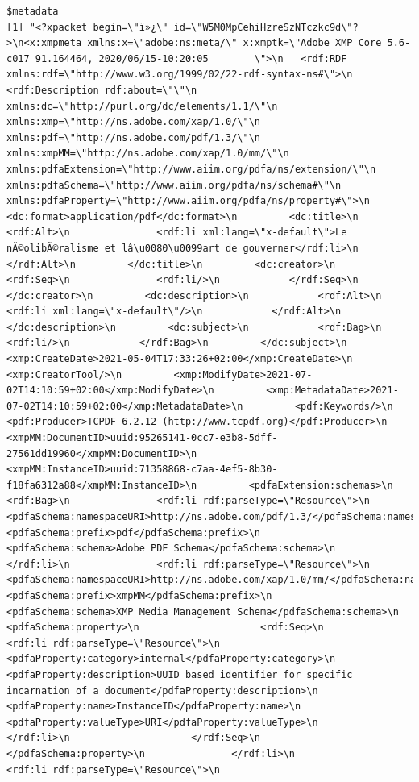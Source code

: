 \documentclass[
  letterpaper,
  DIV=11,
  numbers=noendperiod]{scrreprt}
\begin{document}
\begin{verbatim}
$metadata
[1] "<?xpacket begin=\"ï»¿\" id=\"W5M0MpCehiHzreSzNTczkc9d\"?>\n<x:xmpmeta xmlns:x=\"adobe:ns:meta/\" x:xmptk=\"Adobe XMP Core 5.6-c017 91.164464, 2020/06/15-10:20:05        \">\n   <rdf:RDF xmlns:rdf=\"http://www.w3.org/1999/02/22-rdf-syntax-ns#\">\n      <rdf:Description rdf:about=\"\"\n            xmlns:dc=\"http://purl.org/dc/elements/1.1/\"\n            xmlns:xmp=\"http://ns.adobe.com/xap/1.0/\"\n            xmlns:pdf=\"http://ns.adobe.com/pdf/1.3/\"\n            xmlns:xmpMM=\"http://ns.adobe.com/xap/1.0/mm/\"\n            xmlns:pdfaExtension=\"http://www.aiim.org/pdfa/ns/extension/\"\n            xmlns:pdfaSchema=\"http://www.aiim.org/pdfa/ns/schema#\"\n            xmlns:pdfaProperty=\"http://www.aiim.org/pdfa/ns/property#\">\n         <dc:format>application/pdf</dc:format>\n         <dc:title>\n            <rdf:Alt>\n               <rdf:li xml:lang=\"x-default\">Le nÃ©olibÃ©ralisme et lâ\u0080\u0099art de gouverner</rdf:li>\n            </rdf:Alt>\n         </dc:title>\n         <dc:creator>\n            <rdf:Seq>\n               <rdf:li/>\n            </rdf:Seq>\n         </dc:creator>\n         <dc:description>\n            <rdf:Alt>\n               <rdf:li xml:lang=\"x-default\"/>\n            </rdf:Alt>\n         </dc:description>\n         <dc:subject>\n            <rdf:Bag>\n               <rdf:li/>\n            </rdf:Bag>\n         </dc:subject>\n         <xmp:CreateDate>2021-05-04T17:33:26+02:00</xmp:CreateDate>\n         <xmp:CreatorTool/>\n         <xmp:ModifyDate>2021-07-02T14:10:59+02:00</xmp:ModifyDate>\n         <xmp:MetadataDate>2021-07-02T14:10:59+02:00</xmp:MetadataDate>\n         <pdf:Keywords/>\n         <pdf:Producer>TCPDF 6.2.12 (http://www.tcpdf.org)</pdf:Producer>\n         <xmpMM:DocumentID>uuid:95265141-0cc7-e3b8-5dff-27561dd19960</xmpMM:DocumentID>\n         <xmpMM:InstanceID>uuid:71358868-c7aa-4ef5-8b30-f18fa6312a88</xmpMM:InstanceID>\n         <pdfaExtension:schemas>\n            <rdf:Bag>\n               <rdf:li rdf:parseType=\"Resource\">\n                  <pdfaSchema:namespaceURI>http://ns.adobe.com/pdf/1.3/</pdfaSchema:namespaceURI>\n                  <pdfaSchema:prefix>pdf</pdfaSchema:prefix>\n                  <pdfaSchema:schema>Adobe PDF Schema</pdfaSchema:schema>\n               </rdf:li>\n               <rdf:li rdf:parseType=\"Resource\">\n                  <pdfaSchema:namespaceURI>http://ns.adobe.com/xap/1.0/mm/</pdfaSchema:namespaceURI>\n                  <pdfaSchema:prefix>xmpMM</pdfaSchema:prefix>\n                  <pdfaSchema:schema>XMP Media Management Schema</pdfaSchema:schema>\n                  <pdfaSchema:property>\n                     <rdf:Seq>\n                        <rdf:li rdf:parseType=\"Resource\">\n                           <pdfaProperty:category>internal</pdfaProperty:category>\n                           <pdfaProperty:description>UUID based identifier for specific incarnation of a document</pdfaProperty:description>\n                           <pdfaProperty:name>InstanceID</pdfaProperty:name>\n                           <pdfaProperty:valueType>URI</pdfaProperty:valueType>\n                        </rdf:li>\n                     </rdf:Seq>\n                  </pdfaSchema:property>\n               </rdf:li>\n               <rdf:li rdf:parseType=\"Resource\">\n                  
\end{verbatim}
\end{document}
